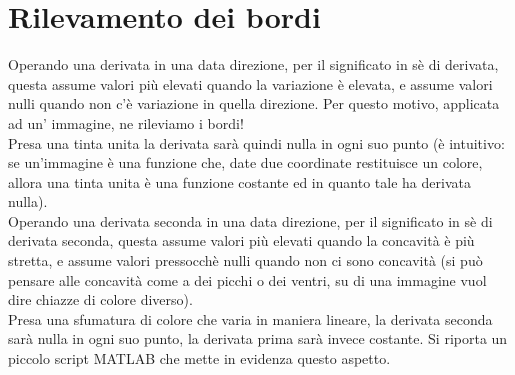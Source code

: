 \section{Rilevamento dei bordi}

Operando una derivata in una data direzione, per il significato in sè di derivata, questa assume valori più elevati quando la variazione è elevata, e assume valori nulli quando non c'è variazione in quella direzione. Per questo motivo, applicata ad un' immagine, ne rileviamo i bordi!\\
Presa una tinta unita la derivata sarà quindi nulla in ogni suo punto (è intuitivo: se un'immagine è una funzione che, date due coordinate restituisce un colore, allora una tinta unita è una funzione costante ed in quanto tale ha derivata nulla).\\
\vspace{1em}
Operando una derivata seconda in una data direzione, per il significato in sè di derivata seconda, questa assume valori più elevati quando la concavità è più stretta, e assume valori pressocchè nulli quando non ci sono concavità (si può pensare alle concavità come a dei picchi o dei ventri, su di una immagine vuol dire chiazze di colore diverso).\\
Presa una sfumatura di colore che varia in maniera lineare, la derivata seconda sarà nulla in ogni suo punto, la derivata prima sarà invece costante. 
\newpage
Si riporta un piccolo script MATLAB che mette in evidenza questo aspetto.
\vspace{1em}
